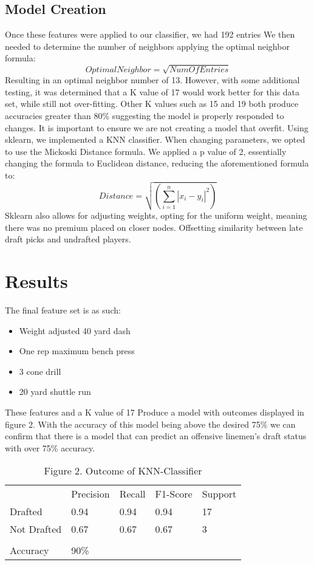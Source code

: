 \documentclass[confrence]{IEEEtran}
\begin{document}
\subsection*{Model Creation}
Once these features were applied to our classifier, we had 192 entries
We then needed to determine the number of neighbors applying the optimal neighbor formula: \[OptimalNeighbor = \sqrt{NumOfEntries}\]
Resulting in an optimal neighbor number of 13.
However, with some additional testing, it was determined that a K value of 17 would work better for this data set, while still not over-fitting.
Other K values such as 15 and 19 both produce accuracies greater than 80\% suggesting the model is properly responded to changes.
It is important to ensure we are not creating a model that overfit.
Using sklearn, we implemented a KNN classifier. When changing parameters, we opted to use the Mickoski Distance formula.
We applied a p value of 2, essentially changing the formula to Euclidean distance, reducing the aforementioned formula to:
\[Distance = \sqrt{(\sum_{i=1}^n|x_i-y_i|^2)}\]
Sklearn also allows for adjusting weights, opting for the uniform weight, meaning there was no premium placed on closer nodes.
Offsetting similarity between late draft picks and undrafted players.
\section*{Results}
The final feature set is as such:
\begin{itemize}
    \item Weight adjusted 40 yard dash
    \item One rep maximum bench press
    \item 3 cone drill
    \item 20 yard shuttle run
\end{itemize}
These features and a K value of 17 Produce a model with outcomes displayed in figure 2.
With the accuracy of this model being above the desired 75\% we can confirm that there is a model that can predict an offensive linemen's draft status with over 75\% accuracy.
\begin{table}[htbp]
    \begin{tabular}{lllll}
                    & Precision & Recall & F1-Score & Support \\
        Drafted     & 0.94      & 0.94   & 0.94     & 17      \\
        Not Drafted & 0.67      & 0.67   & 0.67     & 3       \\
                    &           &        &          &         \\
        Accuracy    & 90\%      &        &          &         \\
    \end{tabular}
    \caption{Figure 2. Outcome of KNN-Classifier}
\end{table}
\end{document}
